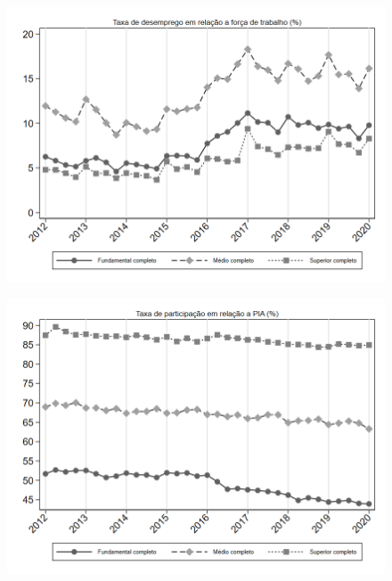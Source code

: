\begin{frame}[label=_composicao_demografica_educacao_taxa_de_desemprego]{}
\textit{\hyperlink{_composicao_demografica_educacao}{}}
\begin{figure}
  \centering
  \includegraphics[width=1.0\linewidth]{../../analysis/output/composicao_demografica/educacao/_composicao_demografica_educacao_taxa_de_desemprego.png}
  \caption{}
  \label{fig:_composicao_demografica_educacao_taxa_de_desemprego}
\end{figure}
\end{frame}

\begin{frame}[label=_composicao_demografica_educacao_taxa_de_participacao]{}
\textit{\hyperlink{_composicao_demografica_educacao}{}}
\begin{figure}
  \centering
  \includegraphics[width=1.0\linewidth]{../../analysis/output/composicao_demografica/educacao/_composicao_demografica_educacao_taxa_de_participacao.png}
  \caption{}
  \label{fig:_composicao_demografica_educacao_taxa_de_participacao}
\end{figure}
\end{frame}

